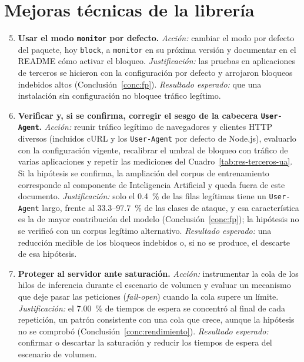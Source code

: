 \section{Mejoras técnicas de la librería}

\begin{enumerate}
    \setcounter{enumi}{4}
    \item \textbf{Usar el modo \texttt{monitor} por defecto.} \textit{Acción:} cambiar el modo por defecto del paquete, hoy \texttt{block}, a \texttt{monitor} en su próxima versión y documentar en el README cómo
    activar el bloqueo. \textit{Justificación:} las pruebas en aplicaciones de terceros se hicieron
    con la configuración por defecto y arrojaron bloqueos indebidos altos
    (Conclusión~\ref{conc:fp}). \textit{Resultado esperado:} que una instalación sin configuración
    no bloquee tráfico legítimo.

    \item \textbf{Verificar y, si se confirma, corregir el sesgo de la cabecera
    \texttt{User-Agent}.} \textit{Acción:} reunir tráfico legítimo de navegadores y clientes HTTP
    diversos (incluidos cURL y los \texttt{User-Agent} por defecto de Node.js), evaluarlo con la
    configuración vigente, recalibrar el umbral de bloqueo con tráfico de varias aplicaciones y
    repetir las mediciones del Cuadro~\ref{tab:res-terceros-ua}. Si la hipótesis se confirma, la
    ampliación del corpus de entrenamiento corresponde al componente de Inteligencia Artificial y
    queda fuera de este documento. \textit{Justificación:} solo el 0.4~\% de las filas legítimas
    tiene un \texttt{User-Agent} largo, frente al 33.3--97.7~\% de las clases de ataque, y esa
    característica es la de mayor contribución del modelo (Conclusión~\ref{conc:fp}); la hipótesis
    no se verificó con un corpus legítimo alternativo. \textit{Resultado esperado:} una reducción
    medible de los bloqueos indebidos o, si no se produce, el descarte de esa hipótesis.

    \item \label{rec:cola}\textbf{Proteger al servidor ante saturación.} \textit{Acción:}
    instrumentar la cola de los hilos de inferencia durante el escenario de volumen y evaluar un
    mecanismo que deje pasar las peticiones (\textit{fail-open}) cuando la cola supere un límite.
    \textit{Justificación:} el 7.00~\% de tiempos de espera se concentró al final de cada
    repetición, un patrón consistente con una cola que crece, aunque la hipótesis no se comprobó
    (Conclusión~\ref{conc:rendimiento}). \textit{Resultado esperado:} confirmar o descartar la
    saturación y reducir los tiempos de espera del escenario de volumen.


\end{enumerate}
